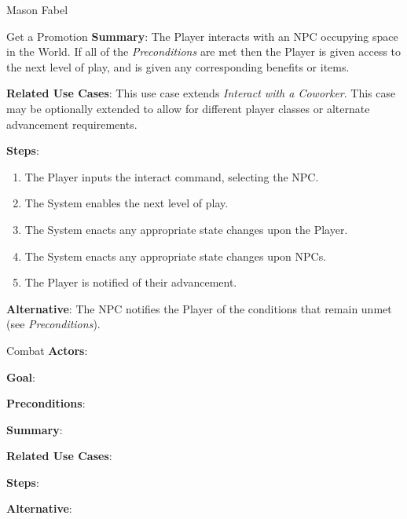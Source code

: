 \documentclass[12pt]{report}
\begin{document}
\begin{section}{Mason Fabel}
\begin{subsection}{Get a Promotion}
\textbf{Summary}:
The Player interacts with an NPC occupying space in the World. If all of
the \textit{Preconditions} are met then the Player is given access to the
next level of play, and is given any corresponding benefits or items.

\textbf{Related Use Cases}:
This use case extends \textit{Interact with a Coworker}. This case may be
optionally extended to allow for different player classes or alternate
advancement requirements.

\textbf{Steps}:
\begin{enumerate}
\item The Player inputs the interact command, selecting the NPC.
\item The System enables the next level of play.
\item The System enacts any appropriate state changes upon the Player.
\item The System enacts any appropriate state changes upon NPCs.
\item The Player is notified of their advancement.
\end{enumerate}

\textbf{Alternative}:
The NPC notifies the Player of the conditions that remain unmet (see
\textit{Preconditions}).
\end{subsection}

\begin{subsection}{Combat}
\textbf{Actors}:

\textbf{Goal}:

\textbf{Preconditions}:

\textbf{Summary}:

\textbf{Related Use Cases}:

\textbf{Steps}:

\textbf{Alternative}:
\end{subsection}
\end{section}
\end{document}

